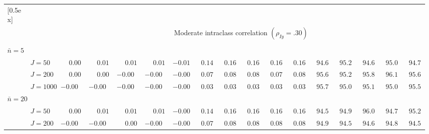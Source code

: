\begin{sidewaystable}
\begin{threeparttable}
\begin{tabular}{llccccccccccccccc}
[0.5ex]\hline\\[-1.6ex] 
& & \multicolumn{15}{c}{Moderate intraclass correlation $(\rho_{Iy}=.30)$} \\[0.6ex]\hline\\[-1.8ex]
\multicolumn{4}{l}{$\bar{n}=5$} \\  & \nopagebreak $\;J=50$  & $\phantom{-}0.00\phantom{0}$ & $\phantom{-}0.01\phantom{0}$ & $\phantom{-}0.01\phantom{0}$ & $\phantom{-}0.01\phantom{0}$ & ${-}0.01\phantom{0}$ & $\phantom{0}0.14\phantom{0}$ & $\phantom{0}0.16\phantom{0}$ & $\phantom{0}0.16\phantom{0}$ & $\phantom{0}0.16\phantom{0}$ & $\phantom{0}0.16\phantom{0}$ & $\phantom{0}94.6\phantom{0}$ & $\phantom{0}95.2\phantom{0}$ & $\phantom{0}94.6\phantom{0}$ & $\phantom{0}95.0\phantom{0}$ & $\phantom{0}94.7\phantom{0}$ \\
 & \nopagebreak $\;J=200$  & $\phantom{-}0.00\phantom{0}$ & $\phantom{-}0.00\phantom{0}$ & ${-}0.00\phantom{0}$ & ${-}0.00\phantom{0}$ & ${-}0.00\phantom{0}$ & $\phantom{0}0.07\phantom{0}$ & $\phantom{0}0.08\phantom{0}$ & $\phantom{0}0.08\phantom{0}$ & $\phantom{0}0.07\phantom{0}$ & $\phantom{0}0.08\phantom{0}$ & $\phantom{0}95.6\phantom{0}$ & $\phantom{0}95.2\phantom{0}$ & $\phantom{0}95.8\phantom{0}$ & $\phantom{0}96.1\phantom{0}$ & $\phantom{0}95.6\phantom{0}$ \\
 & \nopagebreak $\;J=1000$  & ${-}0.00\phantom{0}$ & ${-}0.00\phantom{0}$ & ${-}0.00\phantom{0}$ & ${-}0.00\phantom{0}$ & ${-}0.00\phantom{0}$ & $\phantom{0}0.03\phantom{0}$ & $\phantom{0}0.03\phantom{0}$ & $\phantom{0}0.03\phantom{0}$ & $\phantom{0}0.03\phantom{0}$ & $\phantom{0}0.03\phantom{0}$ & $\phantom{0}95.7\phantom{0}$ & $\phantom{0}95.0\phantom{0}$ & $\phantom{0}95.1\phantom{0}$ & $\phantom{0}95.0\phantom{0}$ & $\phantom{0}95.5\phantom{0}$ \\
\multicolumn{4}{l}{$\bar{n}=20$} \\  & \nopagebreak $\;J=50$  & $\phantom{-}0.00\phantom{0}$ & $\phantom{-}0.01\phantom{0}$ & $\phantom{-}0.01\phantom{0}$ & $\phantom{-}0.01\phantom{0}$ & ${-}0.00\phantom{0}$ & $\phantom{0}0.14\phantom{0}$ & $\phantom{0}0.16\phantom{0}$ & $\phantom{0}0.16\phantom{0}$ & $\phantom{0}0.16\phantom{0}$ & $\phantom{0}0.16\phantom{0}$ & $\phantom{0}94.5\phantom{0}$ & $\phantom{0}94.9\phantom{0}$ & $\phantom{0}96.0\phantom{0}$ & $\phantom{0}94.7\phantom{0}$ & $\phantom{0}95.2\phantom{0}$ \\
 & \nopagebreak $\;J=200$  & ${-}0.00\phantom{0}$ & ${-}0.00\phantom{0}$ & $\phantom{-}0.00\phantom{0}$ & ${-}0.00\phantom{0}$ & ${-}0.00\phantom{0}$ & $\phantom{0}0.07\phantom{0}$ & $\phantom{0}0.08\phantom{0}$ & $\phantom{0}0.08\phantom{0}$ & $\phantom{0}0.08\phantom{0}$ & $\phantom{0}0.08\phantom{0}$ & $\phantom{0}94.9\phantom{0}$ & $\phantom{0}94.5\phantom{0}$ & $\phantom{0}94.6\phantom{0}$ & $\phantom{0}94.8\phantom{0}$ & $\phantom{0}94.5\phantom{0}$ \\

\end{tabular}
\end{threeparttable}
\end{sidewaystable}
